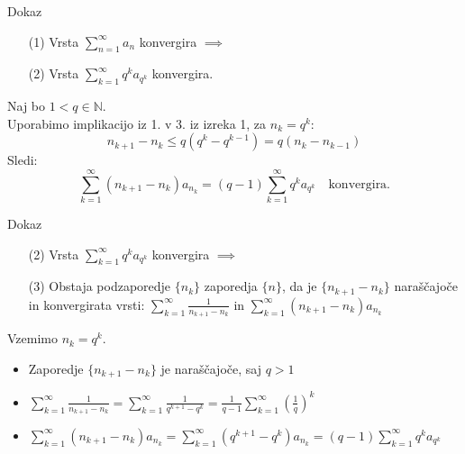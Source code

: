 \documentclass{beamer}
\begin{document}
\begin{frame}{Dokaz}
    \begin{block}{}
        \begin{enumerate}   
            \item[(1)] Vrsta $\sum_{n = 1}^{\infty}{a_n}$ konvergira $\implies$
            \item[(2)] Vrsta $\sum_{k = 1}^{\infty}{q^ka_{q^k}}$ konvergira.
        \end{enumerate}
    \end{block}     
    
    Naj bo $ 1 < q \in {\mathbb{N}}$.\\
    Uporabimo implikacijo iz 1. v 3.
    iz izreka 1, za $n_k = q^k$:\\
    \[
        n_{k+1} - n_k \leq q(q^k - q^{k-1}) = q(n_{k} - n_{k - 1})
    \]
    \pause
    Sledi:
    \[
        \sum_{k = 1}^{\infty}{(n_{k+1} - n_k)a_{n_k}} = (q-1)\sum_{k = 1}^{\infty}{q^ka_{q^k}} 
        \quad \text{konvergira.}
    \]    
\end{frame}
\begin{frame}{Dokaz}
    \begin{block}{}
        \begin{enumerate} 
            \item[(2)] Vrsta $\sum_{k = 1}^{\infty}{q^ka_{q^k}}$ konvergira $\implies$
            \item[(3)] Obstaja podzaporedje $\{n_k\}$ zaporedja $\{n\}$, da je $\{n_{k+1} - n_k\}$ 
            naraščajoče in konvergirata vrsti:
            $\sum_{k = 1}^{\infty}{\frac{1}{n_{k+1} - n_k}}$ in 
            $\sum_{k = 1}^{\infty}{(n_{k+1} - n_k)a_{n_k}}$
        \end{enumerate}
    \end{block}     
    
    Vzemimo ${n_k} = q^k$.
    \pause 
    \begin{itemize}
        \item Zaporedje $\{n_{k+1} - n_k\}$ je naraščajoče, saj $ q > 1$
        \pause
        \item 
        $\sum_{k = 1}^{\infty}{\frac{1}{n_{k+1} - n_k}} = 
        \sum_{k = 1}^{\infty}{\frac{1}{q^{k + 1} - q^k}} =
        \frac{1}{q - 1}\sum_{k = 1}^{\infty}{(\frac{1}{q})^k}$
        \pause
        \item 
        $\sum_{k = 1}^{\infty}{(n_{k+1} - n_k)a_{n_k}} =
        \sum_{k = 1}^{\infty}{(q^{k + 1} - q^k)}a_{n_k} =
        (q - 1)\sum_{k = 1}^{\infty}{q^ka_{q^k}}$        
    \end{itemize}
    
\end{frame}
\end{document}
